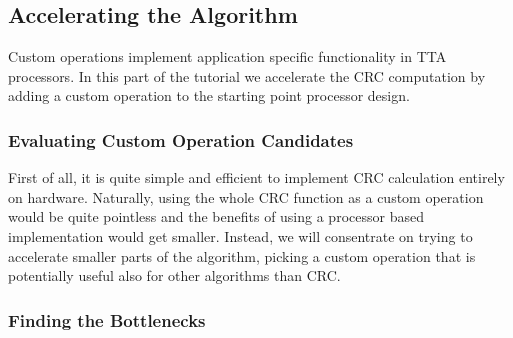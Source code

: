 \documentclass[twoside]{tceusermanual}
\begin{document}


\subsection{Accelerating the Algorithm}

Custom operations implement application specific functionality in TTA
processors. In this part of the tutorial we accelerate the CRC computation
by adding a custom operation to the starting point processor design.

\subsubsection{Evaluating Custom Operation Candidates}

First of all, it is quite simple and efficient to implement CRC calculation
entirely on hardware. Naturally, using the whole CRC function as a custom
operation would be quite pointless and the benefits of using a processor
based implementation would get smaller. Instead, we will consentrate
on trying to accelerate smaller parts of the algorithm, picking a custom
operation that is potentially useful also for other algorithms than CRC.

\subsubsection{Finding the Bottlenecks}

\end{document}
